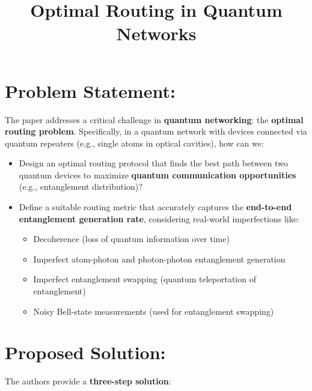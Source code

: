 \documentclass{article}
\title{Optimal Routing in Quantum Networks}
\begin{document}
\maketitle

\section*{Problem Statement:}
The paper addresses a critical challenge in \textbf{quantum networking}: the \textbf{optimal routing problem}. Specifically, in a quantum network with devices connected via quantum repeaters (e.g., single atoms in optical cavities), how can we:

\begin{itemize}
    \item Design an optimal routing protocol that finds the best path between two quantum devices to maximize \textbf{quantum communication opportunities} (e.g., entanglement distribution)?
    \item Define a suitable routing metric that accurately captures the \textbf{end-to-end entanglement generation rate}, considering real-world imperfections like:
    \begin{itemize}
        \item Decoherence (loss of quantum information over time)
        \item Imperfect atom-photon and photon-photon entanglement generation
        \item Imperfect entanglement swapping (quantum teleportation of entanglement)
        \item Noisy Bell-state measurements (used for entanglement swapping)
    \end{itemize}
\end{itemize}

\section*{Proposed Solution:}
The authors provide a \textbf{three-step solution}:
\end{document}

